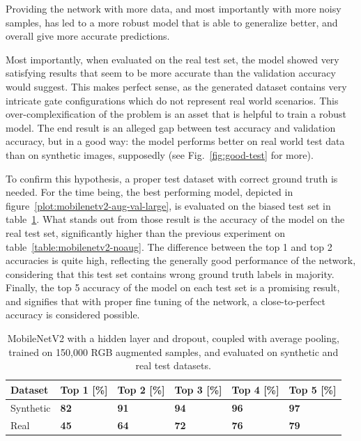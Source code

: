 Providing the network with more data, and most importantly with more noisy
samples, has led to a more robust model that is able to generalize better, and
overall give more accurate predictions.



Most importantly, when evaluated on the real test set, the model showed very
satisfying results that seem to be more accurate than the validation accuracy
would suggest. This makes perfect sense, as the generated dataset contains very
intricate gate configurations which do not represent real world scenarios. This
over-complexification of the problem is an asset that is helpful to train a
robust model. The end result is an alleged gap between test accuracy and
validation accuracy, but in a good way: the model performs better on real
world test data than on synthetic images, supposedly (see
Fig.~\ref{fig:good-test} for more).

To confirm this hypothesis, a proper test dataset with correct ground truth is
needed. For the time being, the best performing model, depicted in
figure~\ref{plot:mobilenetv2-aug-val-large}, is evaluated on the biased test
set in table~\ref{table:mobilenetv2-best}. What stands out from those result is
the accuracy of the model on the real test set, significantly higher than the
previous experiment on table~\ref{table:mobilenetv2-noaug}. The difference
between the top 1 and top 2 accuracies is quite high, reflecting the generally
good performance of the network, considering that this test set contains
wrong ground truth labels in majority. Finally, the top 5 accuracy of the model
on each test set is a promising result, and signifies that with proper fine
tuning of the network, a close-to-perfect accuracy is considered possible.

\begin{table}[!h]
    \centering
    \caption[Top-N accuracies for MobileNetV2 on real and synthetic test
    datasets, with image augmentation]{MobileNetV2 with a hidden layer and
    dropout, coupled with average pooling, trained on 150,000 RGB augmented
    samples, and evaluated on synthetic and real test datasets.}
    \begin{tabular}{llllll}
        \toprule
		Dataset & Top 1 [\%] & Top 2 [\%] & Top 3 [\%] & Top 4 [\%] & Top 5 [\%]\\
        \midrule         
        Synthetic & \textbf{82} & \textbf{91} & \textbf{94} & \textbf{96} &
        \textbf{97} \\ 
        Real & \textbf{45} & \textbf{64} & \textbf{72} & \textbf{76} &
        \textbf{79} \\
        \bottomrule
    \end{tabular}
    \label{table:mobilenetv2-best}
\end{table}


